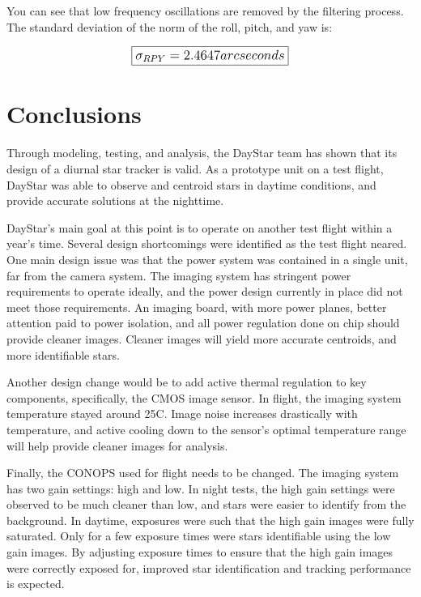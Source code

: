 \documentclass[twocolumn,letterpaper]{IEEEAerospace2012}
\begin{document}
You can see that low frequency oscillations are removed by the filtering process. The standard deviation of the norm of the roll, pitch, and yaw is:

\begin{displaymath}\large
    \boxed{\sigma_{RPY} = 2.4647 arcseconds}
\end{displaymath}

\section{Conclusions}
Through modeling, testing, and analysis, the DayStar team has shown that its design of a diurnal star tracker is valid. As a prototype unit on a test flight, DayStar was able to observe and centroid stars in daytime conditions, and provide accurate solutions at the nighttime.

DayStar's main goal at this point is to operate on another test flight within a year's time. Several design shortcomings were identified as the test flight neared. One main design issue was that the power system was contained in a single unit, far from the camera system. The imaging system has stringent power requirements to operate ideally, and the power design currently in place did not meet those requirements. An imaging board, with more power planes, better attention paid to power isolation, and all power regulation done on chip should provide cleaner images. Cleaner images will yield more accurate centroids, and more identifiable stars.

Another design change would be to add active thermal regulation to key components, specifically, the CMOS image sensor. In flight, the imaging system temperature stayed around 25C. Image noise increases drastically with temperature, and active cooling down to the sensor's optimal temperature range will help provide cleaner images for analysis.

Finally, the CONOPS used for flight needs to be changed. The imaging system has two gain settings: high and low. In night tests, the high gain settings were observed to be much cleaner than low, and stars were easier to identify from the background. In daytime, exposures were such that the high gain images were fully saturated. Only for a few exposure times were stars identifiable using the low gain images. By adjusting exposure times to ensure that the high gain images were correctly exposed for, improved star identification and tracking performance is expected.
\end{document}
